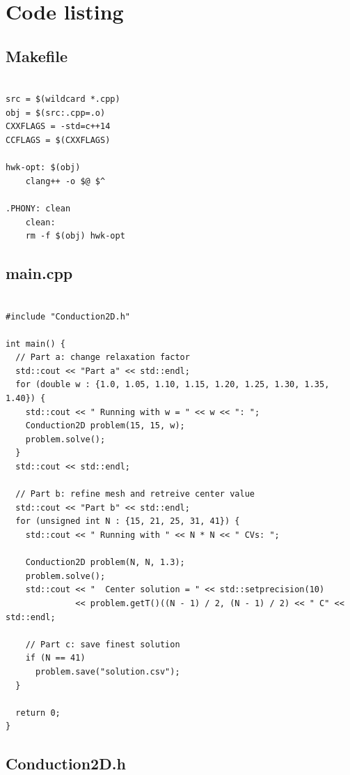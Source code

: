\documentclass{article}
\begin{document}
\section*{Code listing}

\subsection*{Makefile}

\begin{verbatim}

src = $(wildcard *.cpp)
obj = $(src:.cpp=.o)
CXXFLAGS = -std=c++14
CCFLAGS = $(CXXFLAGS)

hwk-opt: $(obj)
	clang++ -o $@ $^

.PHONY: clean
	clean:
	rm -f $(obj) hwk-opt

\end{verbatim}

\subsection*{main.cpp}

\begin{verbatim}

#include "Conduction2D.h"

int main() {
  // Part a: change relaxation factor
  std::cout << "Part a" << std::endl;
  for (double w : {1.0, 1.05, 1.10, 1.15, 1.20, 1.25, 1.30, 1.35, 1.40}) {
    std::cout << " Running with w = " << w << ": ";
    Conduction2D problem(15, 15, w);
    problem.solve();
  }
  std::cout << std::endl;

  // Part b: refine mesh and retreive center value
  std::cout << "Part b" << std::endl;
  for (unsigned int N : {15, 21, 25, 31, 41}) {
    std::cout << " Running with " << N * N << " CVs: ";

    Conduction2D problem(N, N, 1.3);
    problem.solve();
    std::cout << "  Center solution = " << std::setprecision(10)
              << problem.getT()((N - 1) / 2, (N - 1) / 2) << " C" << std::endl;

    // Part c: save finest solution
    if (N == 41)
      problem.save("solution.csv");
  }

  return 0;
}

\end{verbatim}

\subsection*{Conduction2D.h}
\end{document}
